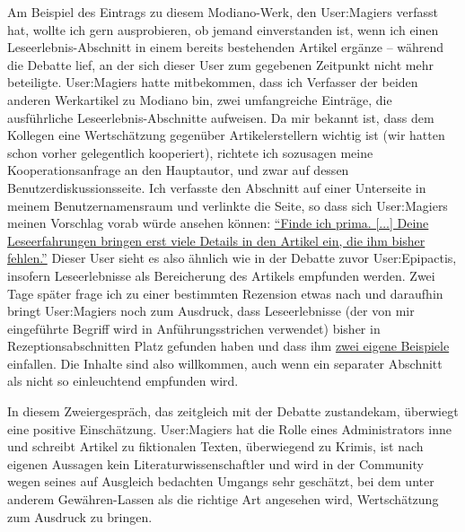 \documentclass[fontsize=12pt]{scrartcl}
\begin{document}
Am Beispiel des Eintrags zu diesem Modiano-Werk, den \mbox{User}:Magiers verfasst hat, wollte ich gern ausprobieren, ob jemand einverstanden ist, wenn ich einen Leseerleb\-nis-Ab\-schnitt in einem bereits bestehenden Artikel erg\"anze -- w\"ahrend die Debatte lief, an der sich dieser \mbox{User} zum gegebenen Zeitpunkt nicht mehr beteiligte. \mbox{User}:Magiers hatte mitbekommen, dass ich Verfasser\textsuperscript{\tiny *} der beiden anderen Werkartikel zu Modiano bin, zwei umfangreiche Eintr\"age, die ausf\"uhrliche Leseerlebnis-Abschnitte aufweisen. Da mir bekannt ist, dass dem Kollegen\textsuperscript{\tiny *} eine Wertsch\"atzung gegen\"uber Artikel\-erstellern\textsuperscript{\tiny *} wichtig ist (wir hatten schon vorher gelegentlich ko\-ope\-riert), rich\-te\-te ich sozusagen meine Kooperationsanfrage an den Hauptautor\textsuperscript{\tiny *}, und zwar auf dessen Be\-nut\-zerdis\-kus\-si\-onsseite. Ich verfasste den Abschnitt auf einer Unterseite in meinem Be\-nut\-zernamensraum und verlinkte die Seite, so dass sich \mbox{User}:Magiers meinen Vorschlag vorab w\"urde ansehen k\"onnen: 
\href{https://de.wikipedia.org/w/index.php?title=Benutzer_Diskussion:Magiers&diff=next&oldid=138016279}{"`Finde ich prima. [...] Deine Le\-se\-er\-fah\-r\-un\-gen bringen erst viele Details in den Artikel ein, die ihm bis\-her fehlen."'} Dieser \mbox{User} sieht es also \"ahnlich wie in der Debatte zuvor \mbox{User}:Epipactis, insofern Leseerlebnisse als Bereicherung des Artikels empfunden werden. Zwei Tage sp\"ater frage ich zu einer bestimmten Rezension etwas nach und daraufhin bringt \mbox{User}:Magiers noch zum Ausdruck, dass Leseerlebnisse (der von mir eingef\"uhrte Begriff wird in Anf\"uh\-rungsstrichen verwendet) bis\-her in Rezeptionsabschnitten Platz gefunden haben und dass ihm\textsuperscript{\tiny *} \href{https://de.wikipedia.org/w/index.php?title=Benutzer_Diskussion:Magiers&diff=next&oldid=138104304}{zwei eigene Beispiele} einfallen. Die Inhalte sind also willkommen, auch wenn ein separater Abschnitt als nicht so einleuchtend empfunden wird.

In diesem Zweiergespr\"ach, das zeitgleich mit der Debatte zustandekam, \"uberwiegt eine positive Einsch\"atzung. \mbox{User}:Magiers hat die Rolle eines Administrators\textsuperscript{\tiny *} inne und schreibt Artikel zu fiktionalen Texten, \"uberwiegend zu Krimis, ist nach eigenen Aussagen kein Li\-te\-ra\-tur\-wissenschaftler\textsuperscript{\tiny *} und wird in der Community wegen seines auf Ausgleich bedachten Umgangs sehr gesch\"atzt, bei dem unter anderem Gew\"ahren-Lassen als die richtige Art angesehen wird, Wertsch\"atzung zum Ausdruck zu bringen.\newline 
\end{document}
